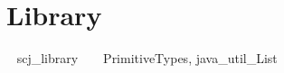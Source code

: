 \section{Library}
\vspace{-0.75em}

\begin{zsection}
  \SECTION ~ scj\_library ~ \parents ~ PrimitiveTypes, java\_util\_List
\end{zsection}
